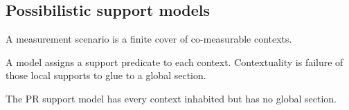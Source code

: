 \subsection{Possibilistic support models}

\begin{proposition}\label{thm:measurement-scenario}\leanok{}
A measurement scenario is a finite cover of co-measurable contexts.
\end{proposition}

\begin{proposition}\label{thm:possibilistic-model}\leanok{}
A model assigns a support predicate to each context. Contextuality is failure
of those local supports to glue to a global section.
\end{proposition}

\begin{theorem}\label{thm:pr-box-strong-contextual}\leanok{}
The PR support model has every context inhabited but has no global section.
\end{theorem}
